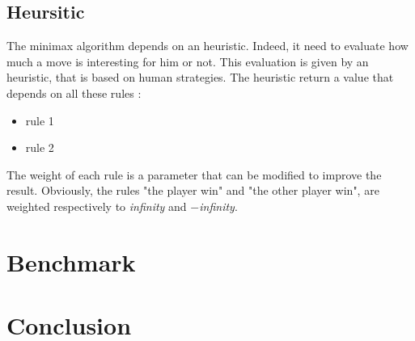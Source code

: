 \documentclass{article}
\begin{document}
\subsection{Heursitic}
The minimax algorithm depends on an heuristic. Indeed, it need to evaluate how much a move is interesting for him %
or not. This evaluation is given by an heuristic, that is based on human strategies.
The heuristic return a value that depends on all these rules :
\begin{itemize}
    \item rule 1
    \item rule 2
\end{itemize}
The weight of each rule is a parameter that can be modified to improve the result. Obviously, the rules "the player win" and "the other player win", are weighted respectively
to \textit{infinity} and $-$\textit{infinity}.

\section{Benchmark} \label{sec:benchmark}

\section{Conclusion}
\end{document}
